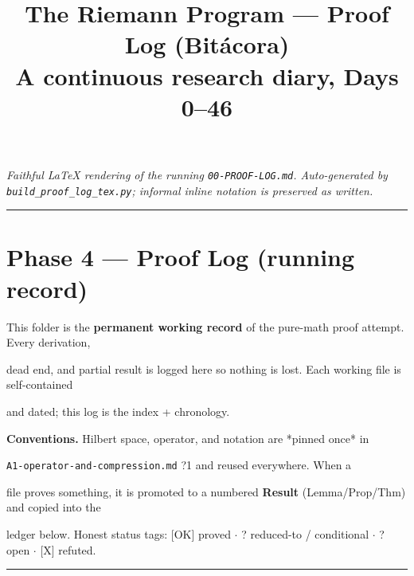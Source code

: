 \documentclass[10pt]{article}
\title{\textbf{The Riemann Program --- Proof Log (Bit\'acora)}\\[4pt]
\large A continuous research diary, Days 0--46}
\date{}
\begin{document}
\maketitle
\noindent\emph{Faithful LaTeX rendering of the running \texttt{00-PROOF-LOG.md}.
Auto-generated by \texttt{build\_proof\_log\_tex.py}; informal inline notation is
preserved as written.}\par\medskip
\hrule\medskip
\section*{Phase 4 --- Proof Log (running record)}

This folder is the \textbf{permanent working record} of the pure-math proof attempt. Every derivation,\par
dead end, and partial result is logged here so nothing is lost. Each working file is self-contained\par
and dated; this log is the index + chronology.\par

\textbf{Conventions.} Hilbert space, operator, and notation are *pinned once* in\par
\texttt{A1-operator-and-compression.md} ?1 and reused everywhere. When a\par
file proves something, it is promoted to a numbered \textbf{Result} (Lemma/Prop/Thm) and copied into the\par
ledger below. Honest status tags: [OK] proved \ensuremath{\cdot} ? reduced-to / conditional \ensuremath{\cdot} ? open \ensuremath{\cdot} [X] refuted.\par

\medskip\hrule\medskip
\end{document}
